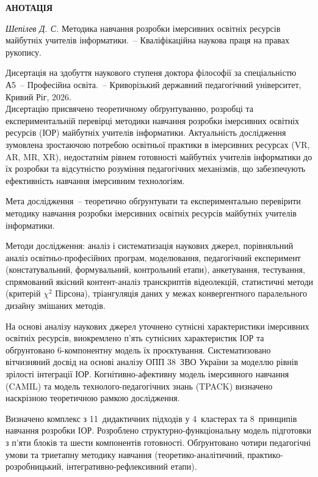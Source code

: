 \begin{center}
{\large \textbf{АНОТАЦІЯ}}
\end{center}

\textit{Шепілев Д. С.} Методика навчання розробки імерсивних освітніх ресурсів майбутніх учителів інформатики.~-- Кваліфікаційна наукова праця на правах рукопису.

Дисертація на здобуття наукового ступеня доктора філософії за спеціальністю А5~-- Професійна освіта.~-- Криворізький державний педагогічний університет, Кривий Ріг, 2026.\\

Дисертацію присвячено теоретичному обґрунтуванню, розробці та експериментальній перевірці методики навчання розробки імерсивних освітніх ресурсів (ІОР) майбутніх учителів інформатики. Актуальність дослідження зумовлена зростаючою потребою освітньої практики в імерсивних ресурсах (VR, AR, MR, XR), недостатнім рівнем готовності майбутніх учителів інформатики до їх розробки та відсутністю розуміння педагогічних механізмів, що забезпечують ефективність навчання імерсивним технологіям.

Мета дослідження~-- теоретично обґрунтувати та експериментально перевірити методику навчання розробки імерсивних освітніх ресурсів майбутніх учителів інформатики.

Методи дослідження: аналіз і систематизація наукових джерел, порівняльний аналіз освітньо-професійних програм, моделювання, педагогічний експеримент (констатувальний, формувальний, контрольний етапи), анкетування, тестування, спрямований якісний контент-аналіз транскриптів відеолекцій, статистичні методи (критерій $\chi^2$ Пірсона), тріангуляція даних у межах конвергентного паралельного дизайну змішаних методів.

На основі аналізу наукових джерел уточнено сутнісні характеристики імерсивних освітніх ресурсів, виокремлено п'ять сутнісних характеристик ІОР та обґрунтовано 6-компонентну модель їх проєктування. Систематизовано вітчизняний досвід на основі аналізу ОПП 38~ЗВО України за моделлю рівнів зрілості інтеграції ІОР. Когнітивно-афективну модель імерсивного навчання (CAMIL) та модель технолого-педагогічних знань (TPACK) визначено наскрізною теоретичною рамкою дослідження.

Визначено комплекс з 11~дидактичних підходів у 4~кластерах та 8~принципів навчання розробки ІОР. Розроблено структурно-функціональну модель підготовки з п'яти блоків та шести компонентів готовності. Обґрунтовано чотири педагогічні умови та триетапну методику навчання (теоретико-аналітичний, практико-розробницький, інтегративно-рефлексивний етапи).

